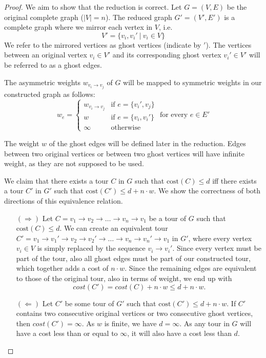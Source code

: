 \documentclass{article}
\begin{document}
\begin{proof}
    We aim to show that the reduction is correct. Let $G=(V,E)$ be the original complete graph ($|V| = n$). The reduced graph $G'=(V',E')$ is a complete graph where we mirror each vertex in $V$, i.e.
    \[
        V' = \{v_i, v_i'\ |\ v_i \in V\}
    \]
    We refer to the mirrored vertices as ghost vertices (indicate by $'$). The vertices between an original vertex $v_i \in V'$ and its corresponding ghost vertex $v_i' \in V'$ will be referred to as a ghost edges. 

    The asymmetric weights $w_{v_i \to v_j}$ of $G$ will be mapped to symmetric weights in our constructed graph as follows:
    \[
        w_e = \begin{cases}
            w_{v_i \to v_j} & \text{if }e = \{v_i', v_j\}\\
            w & \text{if }e = \{v_i, v_i'\}\\
            \infty & \text{otherwise}
        \end{cases} \text{ for every } e \in E'
    \]

    The weight $w$ of the ghost edges will be defined later in the reduction. Edges between two original vertices or between two ghost vertices will have infinite weight, as they are not supposed to be used.
    
    
    We claim that there exists a tour $C$ in $G$ such that $\text{cost}(C) \le d$ iff there exists a tour $C'$ in $G'$ such that $\text{cost}(C') \le d + n \cdot w$. We show the correctness of both directions of this equivalence relation.

    \begin{itemize}
        \item[$(\Rightarrow)$]  Let $C = v_1 \rightarrow v_2 \rightarrow \dots \rightarrow v_n \rightarrow v_1$ be a tour of $G$ such that $\text{cost}(C) \le d$. We can create an equivalent tour $C' = v_1 \rightarrow v_1' \rightarrow v_2\rightarrow v_2' \rightarrow \dots \rightarrow v_n \rightarrow v_n' \rightarrow v_1$ in $G'$, where every vertex $v_i \in V$ is simply replaced by the sequence $v_i \rightarrow v_i'$. Since every vertex must be part of the tour, also all ghost edges must be part of our constructed tour, which together adds a cost of $n \cdot w$. Since the remaining edges are equivalent to those of the original tour, also in terms of weight, we end up with \[cost(C') = cost(C) + n \cdot w \le d + n \cdot w.\]

        \item [$(\Leftarrow)$] Let $C'$ be some tour of $G'$ such that $\text{cost}(C') \le d + n \cdot w$. If $C'$ contains two consecutive original vertices or two consecutive ghost vertices, then $cost(C') = \infty$. As $w$ is finite, we have $d = \infty$. As any tour in $G$ will have a cost less than or equal to $\infty$, it will also have a cost less than $d$. 
        

\end{itemize}
\end{proof}
\end{document}
